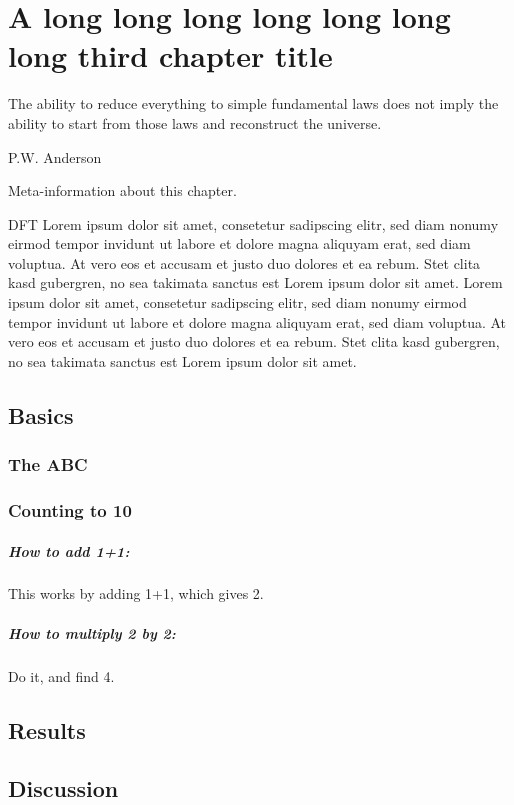 \chapter[A short form of the third chapter's title]{A long long long long long long long third chapter title}
\label{cha:third-results}

\epigraph{%
    The ability to reduce everything to simple fundamental laws does not imply the ability to start from those laws and reconstruct the universe.}
    {P.W. Anderson~\cite{andersonMore1972}}
    \begin{remarks}
        Meta-information about this chapter.
    \end{remarks}

    \noindent \Ac{DFT} Lorem ipsum dolor sit amet, consetetur sadipscing elitr, sed diam nonumy eirmod tempor invidunt ut labore et dolore magna aliquyam erat, sed diam voluptua.
    At vero eos et accusam et justo duo dolores et ea rebum.
    Stet clita kasd gubergren, no sea takimata sanctus est Lorem ipsum dolor sit amet.
    Lorem ipsum dolor sit amet, consetetur sadipscing elitr, sed diam nonumy eirmod tempor invidunt ut labore et dolore magna aliquyam erat, sed diam voluptua.
    At vero eos et accusam et justo duo dolores et ea rebum.
    Stet clita kasd gubergren, no sea takimata sanctus est Lorem ipsum dolor sit amet. \medskip

\section{Basics}
    \label{sec:third-basics}
    \subsection{The ABC}
        \label{subsec:third-abc}
    \subsection{Counting to 10}
        \label{subsec:third-counting}

    \paragraph{How to add 1+1:} This works by adding 1+1, which gives 2.
    \paragraph{How to multiply 2 by 2:} Do it, and find 4.

%
\section{Results}
    \label{sec:third-results}

%
\section{Discussion}
    \label{sec:third-discussion}